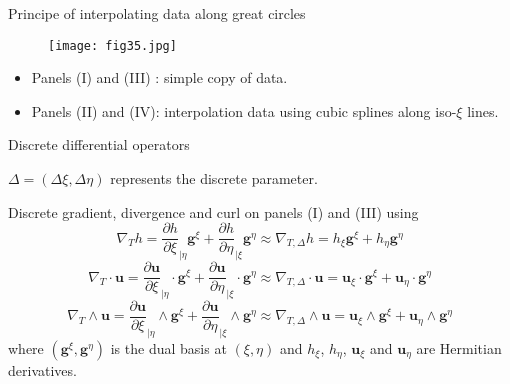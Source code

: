 \documentclass[11pt]{beamer}
\begin{document}
\begin{frame}{Principe of interpolating data along great circles}
\begin{figure}
\begin{center}
\texttt{[image: fig35.jpg]}
\label{fig:152}
\end{center}
\end{figure}
\begin{itemize}
\item Panels (I) and (III) : simple copy of data.
\item Panels (II) and (IV): interpolation data using cubic splines along iso-$\xi$ lines.
\end{itemize}
\end{frame}

\begin{frame}{Discrete differential operators}

$\Delta = (\Delta \xi, \Delta \eta)$ represents the discrete parameter.

\begin{block}{Discrete gradient, divergence and curl}
on panels (I) and (III) using
\begin{equation}
\nabla_{T}h=\frac{\partial h}{\partial\xi}_{|\eta}\mathbf{g}^{\xi}
+\frac{\partial h}{\partial\eta}_{|\xi}\mathbf{g}^{\eta} \approx \nabla_{T,\Delta} h=h_{\xi}\mathbf{g}^{\xi}
+h_{\eta} \mathbf{g}^{\eta}
\end{equation}
\begin{equation}
\nabla_{T} \cdot \mathbf{u}=\frac{\partial \mathbf{u}}{\partial\xi}_{|\eta} \cdot \mathbf{g}^{\xi}
+\frac{\partial \mathbf{u}}{\partial\eta}_{|\xi} \cdot \mathbf{g}^{\eta} \approx \nabla_{T,\Delta} \cdot \mathbf{u}=\mathbf{u}_{\xi} \cdot \mathbf{g}^{\xi}
+\mathbf{u}_{\eta} \cdot \mathbf{g}^{\eta}
\end{equation}
\begin{equation}
\nabla_{T} \wedge \mathbf{u}=\frac{\partial \mathbf{u}}{\partial\xi}_{|\eta} \wedge \mathbf{g}^{\xi}
+\frac{\partial \mathbf{u}}{\partial\eta}_{|\xi} \wedge \mathbf{g}^{\eta} \approx \nabla_{T,\Delta} \wedge \mathbf{u}=\mathbf{u}_{\xi} \wedge \mathbf{g}^{\xi}
+\mathbf{u}_{\eta} \wedge \mathbf{g}^{\eta}
\end{equation}
where $(\mathbf{g}^{\xi},\mathbf{g}^{\eta})$ is the dual basis at $(\xi,\eta)$ and $h_{\xi}$, $h_{\eta}$, $\mathbf{u}_{\xi}$ and $\mathbf{u}_{\eta}$ are Hermitian derivatives.
\end{block}
\end{frame}
\end{document}
